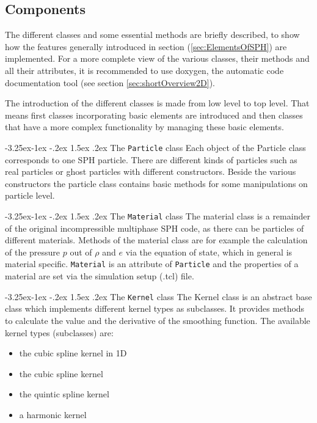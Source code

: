 \documentclass[11pt,a4paper,twoside]{report}
\makeatletter
\renewcommand\paragraph{\@startsection{paragraph}{4}{\z@}%
  {-3.25ex\@plus -1ex \@minus -.2ex}%
  {1.5ex \@plus .2ex}%
  {\normalfont\normalsize\bfseries}}
\makeatother
\begin{document}
\subsection{Components}
\label{sec:Comp2DCode}
The different classes and some essential methods are briefly described, to show how the features generally introduced in section (\ref{sec:ElementsOfSPH}) are implemented. For a more complete view of the various classes, their methods and all their attributes, it is recommended to use doxygen, the automatic code documentation tool (see section \ref{sec:shortOverview2D}).

The introduction of the different classes is made from low level to top level. That means first classes incorporating basic elements are introduced and then classes that have a more complex functionality by managing these basic elements.

\paragraph{The {\tt Particle} class}
Each object of the Particle class corresponds to one SPH particle. There are different kinds of particles such as real particles or ghost particles with different constructors. Beside the various constructors the particle class contains basic methods for some manipulations on particle level.

\paragraph{The {\tt Material} class}
The material class is a remainder of the original incompressible multiphase SPH code, as there can be particles of different materials. Methods of the material class are for example the calculation of the pressure $p$ out of $\rho$ and $e$ via the equation of state, which in general is material specific. {\tt Material} is an attribute of {\tt Particle} and the properties of a material are set via the simulation setup (.tcl) file. 

\paragraph{The {\tt Kernel} class}
The Kernel class is an abstract base class which implements different kernel types as subclasses. It provides methods to calculate the value and the derivative of the smoothing function. 
The available kernel types (subclasses) are:
\begin{itemize}
\item the cubic spline kernel in 1D
\item the cubic spline kernel
\item the quintic spline kernel 
\item a harmonic kernel
\end{itemize}
 
\end{document}
